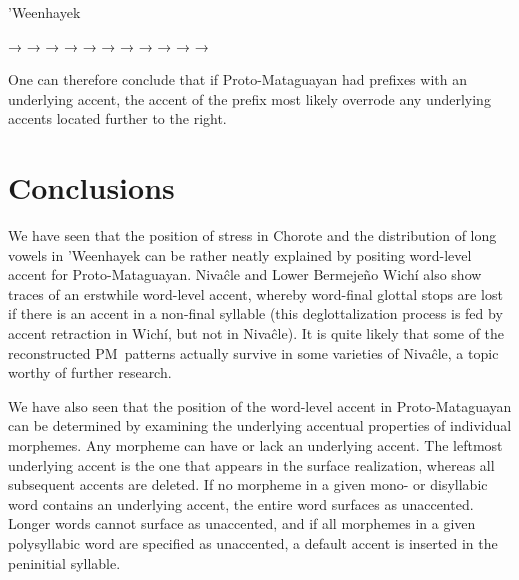 \ea \label{ex:longprefixes:whk}
    ’Weenhayek \citep{KC16}
    \begin{xlist}
        \ex {} → \label{'nookyowej}
        \ex {} → 
        \ex {} → \label{'nooqakya'}
        \ex {} → \label{'aathalàk}
        \ex {} → \label{'noo'nàyij}
        \ex {} → 
        \ex {} → \label{'nootutsaj}
        \ex {} → \label{'aakyoyhet}
        \ex {} → \label{'noojwi'yet}
        \ex {} → \label{'noo'woyis}
        \ex {} → \label{'aapitaj}
    \end{xlist}
\z
{}

One can therefore conclude that if Proto-Mataguayan had prefixes with an underlying accent, the accent of the prefix most likely overrode any underlying accents located further to the right.

\section{Conclusions} \label{prosody-conclusions}

We have seen that the position of stress in Chorote and the distribution of long vowels in 'Weenhayek can be rather neatly explained by positing word-level accent for Proto-Mataguayan. Nivaĉle and Lower Bermejeño Wichí also show traces of an erstwhile word-level accent, whereby word-final glottal stops are lost if there is an accent in a non-final syllable (this deglottalization process is fed by accent retraction in Wichí, but not in Nivaĉle). It is quite likely that some of the reconstructed PM~patterns actually survive in some varieties of Nivaĉle, a topic worthy of further research.

We have also seen that the position of the word-level accent in Proto-Mataguayan can be determined by examining the underlying accentual properties of individual morphemes. Any morpheme can have or lack an underlying accent. The leftmost underlying accent is the one that appears in the surface realization, whereas all subsequent accents are deleted. If no morpheme in a given mono- or disyllabic word contains an underlying accent, the entire word surfaces as unaccented. Longer words cannot surface as unaccented, and if all morphemes in a given polysyllabic word are specified as unaccented, a default accent is inserted in the peninitial syllable.

